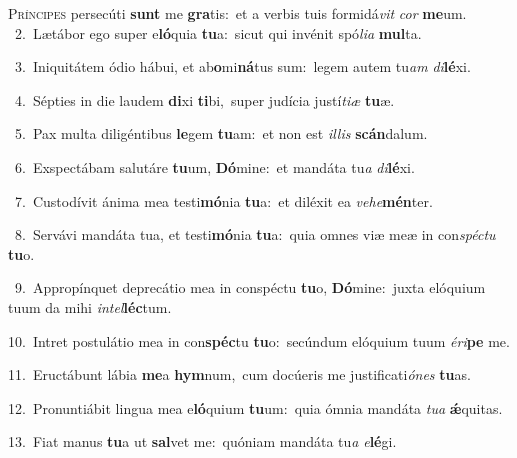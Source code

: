 \lettrine{\initial\textcolor{\initialcolor}{P}}{ríncipes} persecúti \textbf{sunt} me \textbf{gra}\-tis:~\star et a verbis tuis formidá\textit{vit} \textit{cor} \textbf{me}\-um.\\
{\numbfont\textcolor{\numbcolor}{~2.}}~Lætábor ego super e\-\textbf{ló}\-quia \textbf{tu}\-a:~\star sicut qui invénit spó\-\textit{li}\-\textit{a} \textbf{mul}\-ta.\par
{\numbfont\textcolor{\numbcolor}{~3.}}~Iniquitátem ódio hábui, et ab\-\textbf{o}\-mi\-\textbf{ná}\-tus sum:~\star legem autem tu\textit{am} \textit{di}\-\textbf{lé}xi.\par
{\numbfont\textcolor{\numbcolor}{~4.}}~Sépties in die laudem \textbf{di}\-xi \textbf{ti}\-bi,~\star super judícia justí\-\textit{ti}\-\textit{æ} \textbf{tu}\-æ.\par
{\numbfont\textcolor{\numbcolor}{~5.}}~Pax multa diligéntibus \textbf{le}\-gem \textbf{tu}\-am:~\star et non est \textit{il}\-\textit{lis} \textbf{scán}\-dalum.\par
{\numbfont\textcolor{\numbcolor}{~6.}}~Exspectábam salutáre \textbf{tu}\-um, \textbf{Dó}\-mine:~\star et mandáta tu\textit{a} \textit{di}\-\textbf{lé}xi.\par
{\numbfont\textcolor{\numbcolor}{~7.}}~Custodívit ánima mea testi\-\textbf{mó}\-nia \textbf{tu}\-a:~\star et diléxit ea \textit{ve}\-\textit{he}\textbf{mén}ter.\par
{\numbfont\textcolor{\numbcolor}{~8.}}~Servávi mandáta tua, et testi\-\textbf{mó}\-nia \textbf{tu}\-a:~\star quia omnes viæ meæ in con\-\textit{spéc}\-\textit{tu} \textbf{tu}\-o.\par
{\numbfont\textcolor{\numbcolor}{~9.}}~Appropínquet deprecátio mea in conspéctu \textbf{tu}\-o, \textbf{Dó}\-mine:~\star juxta elóquium tuum da mihi \textit{in}\-\textit{tel}\textbf{léc}tum.\par
{\numbfont\textcolor{\numbcolor}{10.}}~Intret postulátio mea in con\-\textbf{spéc}\-tu \textbf{tu}\-o:~\star secúndum elóquium tuum \textit{é}\-\textit{ri}\textbf{pe} me.\par
{\numbfont\textcolor{\numbcolor}{11.}}~Eructábunt lábia \textbf{me}\-a \textbf{hym}\-num,~\star cum docúeris me justificati\-\textit{ó}\-\textit{nes} \textbf{tu}\-as.\par
{\numbfont\textcolor{\numbcolor}{12.}}~Pronuntiábit lingua mea e\-\textbf{ló}\-quium \textbf{tu}\-um:~\star quia ómnia mandáta \textit{tu}\-\textit{a} \textbf{ǽ}\-quitas.\par
{\numbfont\textcolor{\numbcolor}{13.}}~Fiat manus \textbf{tu}\-a ut \textbf{sal}\-vet me:~\star quóniam mandáta tu\textit{a} \textit{e}\-\textbf{lé}gi.\par

